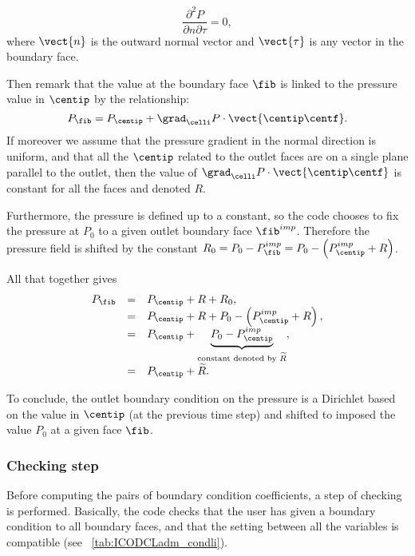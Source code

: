 \begin{equation*}
\displaystyle\frac{\partial^2 P}{\partial n \partial \tau } = 0,
\end{equation*}
where $\vect{n}$ is the outward normal vector and  $\vect{\tau}$ is any 
vector in the boundary face.

Then remark that the value at the boundary face $\fib$ is linked
to the pressure value in $\centip$ by the relationship:
\begin{equation*}
P_\fib = P_{\centip} +  \grad_\celli P \cdot \vect{\centip\centf}.
\end{equation*}
If moreover we assume that the pressure gradient in the normal direction
is uniform, and that all the $\centip$ related to the outlet faces are on 
a single plane parallel to the outlet, then the value of $ \grad_\celli P \cdot \vect{\centip\centf} $
is constant for all the faces and denoted $R$. 

Furthermore, the pressure is defined up to a constant, so the code
chooses to fix the pressure at $P_0$ to a given outlet boundary face 
$\fib^{imp}$. Therefore the pressure field is shifted  by the constant
$R_0=P_0- P_\fib^{imp} = P_0 - \left( P_{\centip}^{imp}+R \right)$.

All that together gives
\begin{equation}\label{Base_Condli_eq_psortie_condli}
\begin{array}{rcl}
P_\fib 
   &=& P_{\centip}+R+R_0,\\
   &=& P_{\centip}+R+P_0- \left( P_{\centip}^{imp}+R \right),\\
   &=&P_{\centip} +\underbrace{P_0-P_{\centip}^{imp}}_{\text{constant denoted by $\widetilde{R}$}} ,\\
   &=&P_{\centip} + \widetilde{R}.
\end{array}
\end{equation}

To conclude, the outlet boundary condition on the pressure is a Dirichlet based on 
the value in $\centip$ (at the previous time step) and shifted to imposed
the value $P_0$ at a given face $\fib$.

\subsubsection{Checking step}

 Before computing the pairs of boundary condition coefficients, a step of checking is performed. Basically, 
the code checks that the user has given a boundary condition to all boundary faces, and that 
the setting between all the variables is compatible (see \tablename~\ref{tab:ICODCLadm_condli}).



